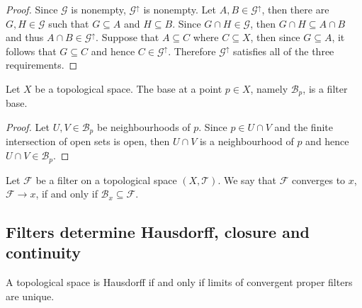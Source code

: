 \begin{proof}
  Since \(\mathcal G\) is nonempty, \(\mathcal G^\uparrow\) is nonempty. Let
  \(A, B \in \mathcal G^\uparrow\), then there are \(G, H \in \mathcal G\) such
  that \(G \subseteq A\) and \(H \subseteq B\). Since \(G \cap H \in \mathcal
  G\), then \(G \cap H \subseteq A \cap B\) and thus \(A \cap B \in \mathcal
  G^\uparrow\). Suppose that \(A \subseteq C\) where \(C \subseteq X\), then
  since \(G \subseteq A\), it follows that \(G \subseteq C\) and hence \(C \in
  \mathcal G^\uparrow\). Therefore \(\mathcal G^\uparrow\) satisfies all of the
  three requirements.
\end{proof}

\begin{proposition}
  Let \(X\) be a topological space. The base at a point \(p \in X\), namely
  \(\mathcal B_p\), is a filter base.
\end{proposition}

\begin{proof}
  Let \(U, V \in \mathcal B_p\) be neighbourhoods of \(p\). Since \(p \in U \cap
  V\) and the finite intersection of open sets is open, then \(U \cap V\) is a
  neighbourhood of \(p\) and hence \(U \cap V \in \mathcal B_p\).
\end{proof}

\begin{definition}
  \label{def: convergence of filters}
  Let \(\mathcal F\) be a filter on a topological space \((X, \mathcal T)\). We
  say that \(\mathcal F\) converges to \(x\), \(\mathcal F \to x\), if and only
  if \(\mathcal B_x \subseteq \mathcal F\).
\end{definition}

\subsection{Filters determine Hausdorff, closure and continuity}

\begin{proposition}[Hausdorff]\label{prop: hausdorff from filter}
  A topological space is Hausdorff if and only if limits of convergent proper
  filters are unique.
\end{proposition}

